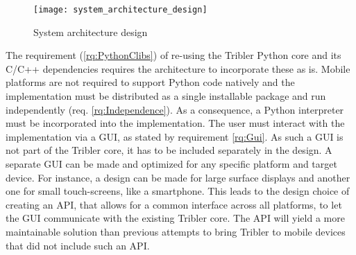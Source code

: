 \begin{figure}[H]
	\centering
	\texttt{[image: system\_architecture\_design]}
	\caption{System architecture design}
	\label{fig:system_architecture_design}
\end{figure}

The requirement (\ref{rq:PythonClibs}) of re-using the Tribler Python core and its C/C++ dependencies requires the architecture to incorporate these as is.
Mobile platforms are not required to support Python code natively and the implementation must be distributed as a single installable package and run independently (req. \ref{rq:Independence}).
As a consequence, a Python interpreter must be incorporated into the implementation.
The user must interact with the implementation via a GUI, as stated by requirement \ref{rq:Gui}.
As such a GUI is not part of the Tribler core, it has to be included separately in the design.
A separate GUI can be made and optimized for any specific platform and target device. %
For instance, a design can be made for large surface displays and another one for small touch-screens, like a smartphone.
This leads to the design choice of creating an API, that allows for a common interface across all platforms, to let the GUI communicate with the existing Tribler core.
The API will yield a more maintainable solution than previous attempts to bring Tribler to mobile devices \cite{bsc1,2,3} that did not include such an API.

